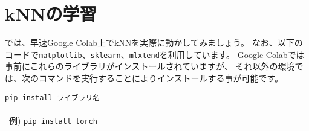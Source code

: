 	\section{kNNの学習}
		では、早速Google Colab上でkNNを実際に動かしてみましょう。
		なお、以下のコードで\texttt{matplotlib}、\texttt{sklearn}、\texttt{mlxtend}を利用しています。
		Google Colabでは事前にこれらのライブラリがインストールされていますが、
		それ以外の環境では、次のコマンドを実行することによりインストールする事が可能です。\\
		
		\begin{framed}
			\texttt{pip install ライブラリ名} \\
			\\ \
			例) \texttt{pip install torch}
		\end{framed}


		
		
